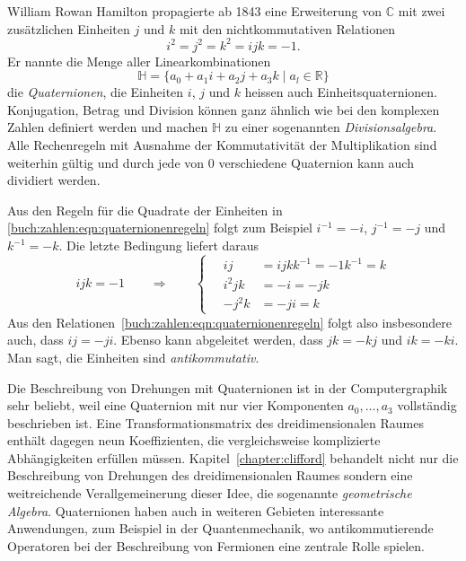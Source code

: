 William Rowan Hamilton propagierte ab 1843 eine Erweiterung von $\mathbb{C}$
%
mit zwei zusätzlichen Einheiten $j$ und $k$ mit den nichtkommutativen
Relationen
\begin{equation}
i^2 = j^2 = k^2 = i\!jk = -1.
\label{buch:zahlen:eqn:quaternionenregeln}
\end{equation}
Er nannte die Menge aller Linearkombinationen 
\[
\mathbb{H} = \{ a_0+a_1i+a_2j+a_3k\;|\; a_l\in \mathbb{R}\}
\]
die {\em Quaternionen}, die Einheiten $i$, $j$ und $k$ heissen auch
%
Einheitsquaternionen.
%
Konjugation, Betrag und Division können ganz ähnlich wie bei den
%
%
%
komplexen Zahlen definiert werden und machen $\mathbb{H}$ zu einer
sogenannten {\em Divisionsalgebra}.
%
Alle Rechenregeln mit Ausnahme der Kommutativität der Multiplikation
sind weiterhin gültig und durch jede von $0$ verschiedene Quaternion
kann auch dividiert werden.

Aus den Regeln für die Quadrate der Einheiten in
\eqref{buch:zahlen:eqn:quaternionenregeln} folgt zum Beispiel
$i^{-1}=-i$, $j^{-1}=-j$ und $k^{-1}=-k$.
Die letzte Bedingung liefert daraus
\[
i\!jk=-1
\qquad\Rightarrow\qquad
\left\{
\quad
\begin{aligned}
i\!j
&=
i\!jkk^{-1}=-1k^{-1}=k
\\
i^2\!jk&=-i=-jk
\\
-j^2k&=-ji=k
\end{aligned}
\right.
\]
Aus den Relationen~\eqref{buch:zahlen:eqn:quaternionenregeln}
folgt also insbesondere auch, dass $i\!j=-ji$.
Ebenso kann abgeleitet werden, dass $jk=-k\!j$ und $ik=-ki$.
Man sagt, die Einheiten sind {\em antikommutativ}.
%

Die Beschreibung von Drehungen mit Quaternionen ist in der
Computergraphik sehr beliebt, weil eine Quaternion mit nur vier
Komponenten $a_0,\dots,a_3$ vollständig beschrieben ist.
Eine Transformationsmatrix des dreidimensionalen Raumes enthält
dagegen neun Koeffizienten, die vergleichsweise komplizierte 
Abhängigkeiten erfüllen müssen.
Kapitel~\ref{chapter:clifford} behandelt nicht nur die Beschreibung
von Drehungen des dreidimensionalen Raumes sondern eine weitreichende
Verallgemeinerung dieser Idee, die sogenannte {\em geometrische Algebra}.
%
Quaternionen haben auch in weiteren Gebieten interessante Anwendungen,
zum Beispiel in der Quantenmechanik, wo antikommutierende Operatoren
%
bei der Beschreibung von Fermionen eine zentrale Rolle spielen.
%


